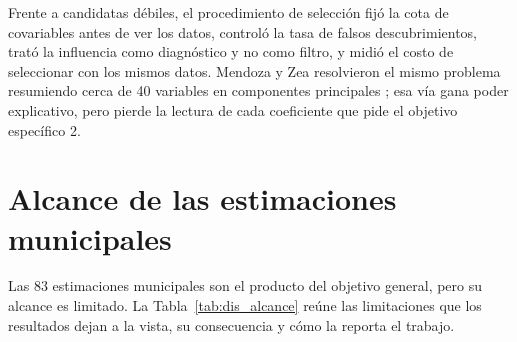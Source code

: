 Frente a candidatas débiles, el procedimiento de selección fijó la cota de covariables antes de ver los datos, controló la tasa de falsos descubrimientos, trató la influencia como diagnóstico y no como filtro, y midió el costo de seleccionar con los mismos datos. Mendoza y Zea resolvieron el mismo problema resumiendo cerca de 40 variables en componentes principales \cite[p.~9]{MendozaZea2019}; esa vía gana poder explicativo, pero pierde la lectura de cada coeficiente que pide el objetivo específico 2.

\section{Alcance de las estimaciones municipales}
\label{sec:dis_alcance}

Las 83 estimaciones municipales son el producto del objetivo general, pero su alcance es limitado. La Tabla~\ref{tab:dis_alcance} reúne las limitaciones que los resultados dejan a la vista, su consecuencia y cómo la reporta el trabajo.

